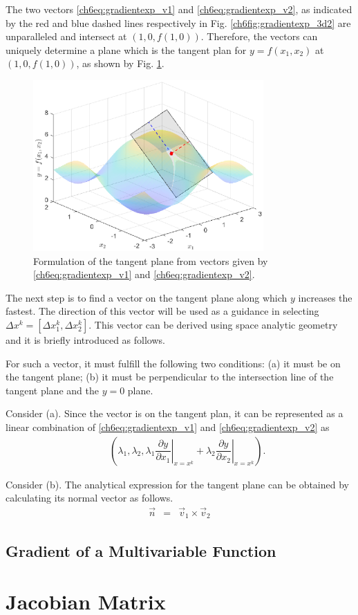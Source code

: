 The two vectors \eqref{ch6eq:gradientexp_v1} and \eqref{ch6eq:gradientexp_v2}, as indicated by the red and blue dashed lines respectively in Fig. \ref{ch6fig:gradientexp_3d2} are unparalleled and intersect at $\left(1,0,f(1,0)\right)$. Therefore, the vectors can uniquely determine a plane which is the tangent plan for $y=f(x_1,x_2)$ at $\left(1,0,f(1,0)\right)$, as shown by Fig. \ref{ch6fig:gradientexp_3d3}.

\begin{figure}
	\centering
	\includegraphics[width=250pt]{chapters/chapter6/figures/gradientexp_3d3.eps}
	\caption{Formulation of the tangent plane from vectors given by \eqref{ch6eq:gradientexp_v1} and \eqref{ch6eq:gradientexp_v2}.} \label{ch6fig:gradientexp_3d3}
\end{figure}

The next step is to find a vector on the tangent plane along which $y$ increases the fastest. The direction of this vector will be used as a guidance in selecting $\Delta x^k = [\Delta x_1^k, \Delta x_2^k]$. This vector can be derived using space analytic geometry and it is briefly introduced as follows. 

For such a vector, it must fulfill the following two conditions: (a) it must be on the tangent plane; (b) it must be perpendicular to the intersection line of the tangent plane and the $y=0$ plane.

Consider (a). Since the vector is on the tangent plan, it can be represented as a linear combination of \eqref{ch6eq:gradientexp_v1} and \eqref{ch6eq:gradientexp_v2} as
\begin{eqnarray}
    && \left(\lambda_1, \lambda_2, \lambda_1\left.\dfrac{\partial y}{\partial x_1}\right|_{x=x^k} + \lambda_2\left.\dfrac{\partial y}{\partial x_2}\right|_{x=x^k} \right) . \nonumber
\end{eqnarray}

Consider (b). The analytical expression for the tangent plane can be obtained by calculating its normal vector as follows.
\begin{eqnarray}
  \vec{n} &=& \vec{v}_1 \times \vec{v}_2
\end{eqnarray}














\subsection{Gradient of a Multivariable Function} \label{ch6subsec:gradientdef}




\section{Jacobian Matrix} \label{ch6sec:jacobianmatrix}
